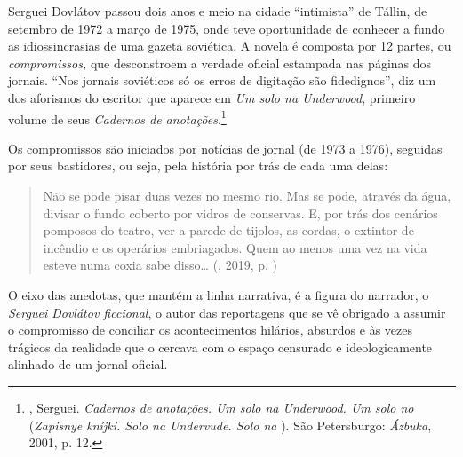 \begin{center}
{}
\end{center}

Serguei Dovlátov passou dois anos e meio na cidade ``intimista'' de
Tállin, de setembro de 1972 a março de 1975, onde teve oportunidade de
conhecer a fundo as idiossincrasias de uma gazeta soviética. A novela é
composta por 12 partes, ou \emph{compromissos,} que desconstroem a
verdade oficial estampada nas páginas dos jornais. ``Nos jornais
soviéticos só os erros de digitação são fidedignos'', diz um dos
aforismos do escritor que aparece em \emph{Um solo na Underwood},
primeiro volume de seus \emph{Cadernos de anotações}.\footnote{,
  Serguei. \emph{Cadernos de anotações. Um solo na Underwood. Um solo no
  } (\emph{Zapisnye kníjki. Solo na Undervude. Solo na }). São
  Petersburgo: \emph{Ázbuka}, 2001, p. 12.}

Os compromissos são iniciados por notícias de jornal (de 1973 a 1976),
seguidas por seus bastidores, ou seja, pela história por trás de cada
uma delas:

\begin{quotation}
Não se pode pisar duas vezes no mesmo rio. Mas se pode, através da água,
divisar o fundo coberto por vidros de conservas. E, por trás dos
cenários pomposos do teatro, ver a parede de tijolos, as cordas, o
extintor de incêndio e os operários embriagados. Quem ao menos uma vez
na vida esteve numa coxia sabe disso\ldots{} 
{}(, 2019, p. \pageref{ref0})
\end{quotation}

O eixo das anedotas, que mantém a linha narrativa, é a figura do
narrador, o \emph{Serguei Dovlátov ficcional}, o autor das reportagens
que se vê obrigado a assumir o compromisso de conciliar os
acontecimentos hilários, absurdos e às vezes trágicos da realidade que o
cercava com o espaço censurado e ideologicamente alinhado de um jornal
oficial.

